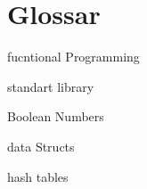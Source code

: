 \chapter*{Glossar}

fucntional Programming

standart library

Boolean Numbers

data Structs

hash tables

